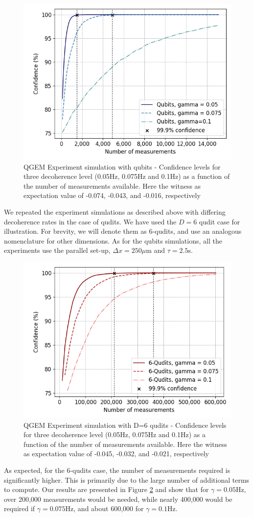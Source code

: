 \documentclass[%
 12pt,
 superscriptaddress,
 amsmath,
 amssymb,
 onecolumn,
 longbibliography
]{revtex4-2}
\begin{document}
	\begin{figure}
    		\includegraphics[width=.5\columnwidth]{EW_confidence_qubits_deco.png}\par\medskip
	    \caption{QGEM Experiment simulation with qubits - Confidence levels for three decoherence level (0.05Hz, 0.075Hz and 0.1Hz) as a function of the number of measurements available. Here the witness as expectation value of -0.074, -0.043, and -0.016, respectively} \label{fig:expsim_qubits_deco}
	\end{figure}
\indent We repeated the experiment simulations as described above with differing decoherence rates in the case of qudits. We have used the $D=6$ qudit case for illustration. For brevity, we will denote them as 6-qudits, and use an analogous nomenclature for other dimensions. As for the qubits simulations, all the experiments use the parallel set-up, $\Delta x = 250 \mu$m and $\tau = 2.5$s.\\
	\begin{figure}
    		\includegraphics[width=.5\columnwidth]{EW_confidence_6qudits_deco.png}\par\medskip
	    \caption{QGEM Experiment simulation with D=6 qudits - Confidence levels for three decoherence level (0.05Hz, 0.075Hz and 0.1Hz) as a function of the number of measurements available. Here the witness as expectation value of -0.045, -0.032, and -0.021, respectively} \label{fig:expsim_qubits_deco_6d}
	\end{figure} 
\indent As expected, for the 6-qudits case, the number of measurements required is significantly higher. This is primarily due to the large number of additional terms to compute. Our results are presented in Figure \ref{fig:expsim_qubits_deco_6d} and show that for $\gamma = 0.05$Hz, over 200,000 measurements would be needed, while nearly 400,000 would be required if $\gamma = 0.075$Hz, and about 600,000 for $\gamma = 0.1$Hz. \\
\end{document}
